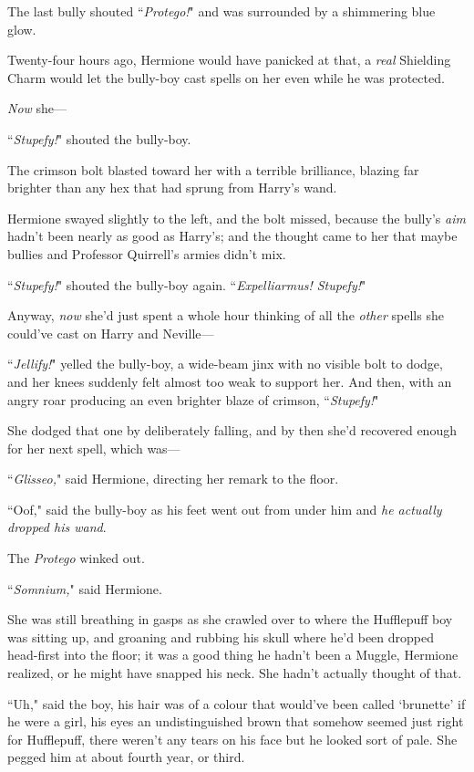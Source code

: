 The last bully shouted ``\emph{Protego!}" and was surrounded by a shimmering blue glow.

Twenty-four hours ago, Hermione would have panicked at that, a \emph{real} Shielding Charm would let the bully-boy cast spells on her even while he was protected.

\emph{Now} she—

``\emph{Stupefy!}" shouted the bully-boy.

The crimson bolt blasted toward her with a terrible brilliance, blazing far brighter than any hex that had sprung from Harry's wand.

Hermione swayed slightly to the left, and the bolt missed, because the bully's \emph{aim} hadn't been nearly as good as Harry's; and the thought came to her that maybe bullies and Professor Quirrell's armies didn't mix.

``\emph{Stupefy!}" shouted the bully-boy again. ``\emph{Expelliarmus! Stupefy!}"

Anyway, \emph{now} she'd just spent a whole hour thinking of all the \emph{other} spells she could've cast on Harry and Neville—

``\emph{Jellify!}" yelled the bully-boy, a wide-beam jinx with no visible bolt to dodge, and her knees suddenly felt almost too weak to support her. And then, with an angry roar producing an even brighter blaze of crimson, ``\emph{Stupefy!}"

She dodged that one by deliberately falling, and by then she'd recovered enough for her next spell, which was—

``\emph{Glisseo,}" said Hermione, directing her remark to the floor.

``Oof," said the bully-boy as his feet went out from under him and \emph{he actually dropped his wand}.

The \emph{Protego} winked out.

``\emph{Somnium,}" said Hermione.

She was still breathing in gasps as she crawled over to where the Hufflepuff boy was sitting up, and groaning and rubbing his skull where he'd been dropped head-first into the floor; it was a good thing he hadn't been a Muggle, Hermione realized, or he might have snapped his neck. She hadn't actually thought of that.

``Uh," said the boy, his hair was of a colour that would've been called `brunette' if he were a girl, his eyes an undistinguished brown that somehow seemed just right for Hufflepuff, there weren't any tears on his face but he looked sort of pale. She pegged him at about fourth year, or third.

